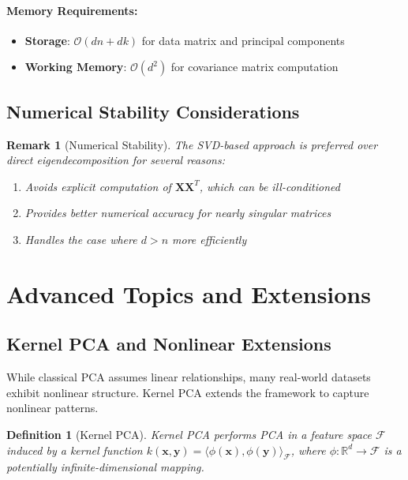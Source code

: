 \documentclass[12pt]{article}
\renewcommand{\vec}[1]{\mathbf{#1}}
\newtheorem{definition}[theorem]{Definition}
\newtheorem{remark}[theorem]{Remark}
\begin{document}
\paragraph{Memory Requirements:}
\begin{itemize}[noitemsep]
    \item \textbf{Storage}: $\mathcal{O}(dn + dk)$ for data matrix and principal components
    \item \textbf{Working Memory}: $\mathcal{O}(d^2)$ for covariance matrix computation
\end{itemize}

\subsection{Numerical Stability Considerations}

\begin{remark}[Numerical Stability]
    The SVD-based approach is preferred over direct eigendecomposition for several reasons:
    \begin{enumerate}[noitemsep]
        \item Avoids explicit computation of $\vec{X}\vec{X}^T$, which can be ill-conditioned
        \item Provides better numerical accuracy for nearly singular matrices
        \item Handles the case where $d > n$ more efficiently
    \end{enumerate}
\end{remark}

\newpage

\section{Advanced Topics and Extensions}


\subsection{Kernel PCA and Nonlinear Extensions}

While classical PCA assumes linear relationships, many real-world datasets exhibit nonlinear structure. Kernel PCA extends the framework to capture nonlinear patterns.

\begin{definition}[Kernel PCA]
    Kernel PCA performs PCA in a feature space $\mathcal{F}$ induced by a kernel function $k(\vec{x}, \vec{y}) = \langle \phi(\vec{x}), \phi(\vec{y}) \rangle_{\mathcal{F}}$, where $\phi: \mathbb{R}^d \rightarrow \mathcal{F}$ is a potentially infinite-dimensional mapping.
\end{definition}
\end{document}
